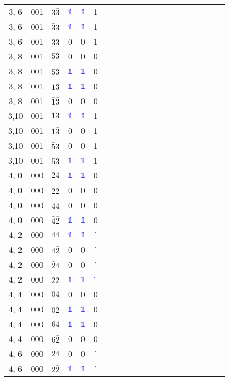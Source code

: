 \begin{longtable*}{c| cccccccccccccccccccc }
3, 6& 001& $3\bar{3}$& \textcolor{blue}{$\mathds{1}$}& \textcolor{blue}{$\mathds{1}$}& 1\\
3, 6& 001& $\bar{3}3$& \textcolor{blue}{$\mathds{1}$}& \textcolor{blue}{$\mathds{1}$}& 1\\
3, 6& 001& $\bar{3}\bar{3}$& 0& 0& 1\\
3, 8& 001& $53$& 0& 0& 0\\
3, 8& 001& $5\bar{3}$& \textcolor{blue}{$\mathds{1}$}& \textcolor{blue}{$\mathds{1}$}& 0\\
3, 8& 001& $\bar{1}3$& \textcolor{blue}{$\mathds{1}$}& \textcolor{blue}{$\mathds{1}$}& 0\\
3, 8& 001& $\bar{1}\bar{3}$& 0& 0& 0\\
3,10& 001& $13$& \textcolor{blue}{$\mathds{1}$}& \textcolor{blue}{$\mathds{1}$}& 1\\
3,10& 001& $1\bar{3}$& 0& 0& 1\\
3,10& 001& $\bar{5}3$& 0& 0& 1\\
3,10& 001& $\bar{5}\bar{3}$& \textcolor{blue}{$\mathds{1}$}& \textcolor{blue}{$\mathds{1}$}& 1\\
4, 0& 000& $24$& \textcolor{blue}{$\mathds{1}$}& \textcolor{blue}{$\mathds{1}$}& 0\\
4, 0& 000& $2\bar{2}$& 0& 0& 0\\
4, 0& 000& $\bar{4}4$& 0& 0& 0\\
4, 0& 000& $\bar{4}\bar{2}$& \textcolor{blue}{$\mathds{1}$}& \textcolor{blue}{$\mathds{1}$}& 0\\
4, 2& 000& $44$& \textcolor{blue}{$\mathds{1}$}& \textcolor{blue}{$\mathds{1}$}& \textcolor{blue}{$\mathds{1}$}\\
4, 2& 000& $4\bar{2}$& 0& 0& \textcolor{blue}{$\mathds{1}$}\\
4, 2& 000& $\bar{2}4$& 0& 0& \textcolor{blue}{$\mathds{1}$}\\
4, 2& 000& $\bar{2}\bar{2}$& \textcolor{blue}{$\mathds{1}$}& \textcolor{blue}{$\mathds{1}$}& \textcolor{blue}{$\mathds{1}$}\\
4, 4& 000& $04$& 0& 0& 0\\
4, 4& 000& $0\bar{2}$& \textcolor{blue}{$\mathds{1}$}& \textcolor{blue}{$\mathds{1}$}& 0\\
4, 4& 000& $64$& \textcolor{blue}{$\mathds{1}$}& \textcolor{blue}{$\mathds{1}$}& 0\\
4, 4& 000& $6\bar{2}$& 0& 0& 0\\
4, 6& 000& $24$& 0& 0& \textcolor{blue}{$\mathds{1}$}\\
4, 6& 000& $2\bar{2}$& \textcolor{blue}{$\mathds{1}$}& \textcolor{blue}{$\mathds{1}$}& \textcolor{blue}{$\mathds{1}$}\\

\end{longtable*}
